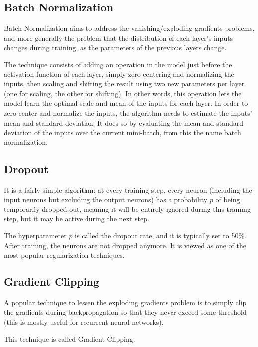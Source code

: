 \documentclass[%
oneside,                 %
final,                   %
10pt]{article}
\begin{document}
\noindent
\subsection{Batch Normalization}

Batch Normalization aims to address the vanishing/exploding gradients
problems, and more generally the problem that the distribution of each
layer’s inputs changes during training, as the parameters of the
previous layers change.

The technique consists of adding an operation in the model just before
the activation function of each layer, simply zero-centering and
normalizing the inputs, then scaling and shifting the result using two
new parameters per layer (one for scaling, the other for shifting). In
other words, this operation lets the model learn the optimal scale and
mean of the inputs for each layer.  In order to zero-center and
normalize the inputs, the algorithm needs to estimate the inputs’ mean
and standard deviation. It does so by evaluating the mean and standard
deviation of the inputs over the current mini-batch, from this the
name batch normalization.

\subsection{Dropout}

It is a fairly simple algorithm: at every training step, every neuron
(including the input neurons but excluding the output neurons) has a
probability $p$ of being temporarily dropped out, meaning it will be
entirely ignored during this training step, but it may be active
during the next step.

The hyperparameter $p$ is called the dropout rate, and it is typically
set to 50\%. After training, the neurons are not dropped anymore.  It
is viewed as one of the most popular regularization techniques.

\subsection{Gradient Clipping}

A popular technique to lessen the exploding gradients problem is to
simply clip the gradients during backpropagation so that they never
exceed some threshold (this is mostly useful for recurrent neural
networks).

This technique is called Gradient Clipping.
\end{document}
